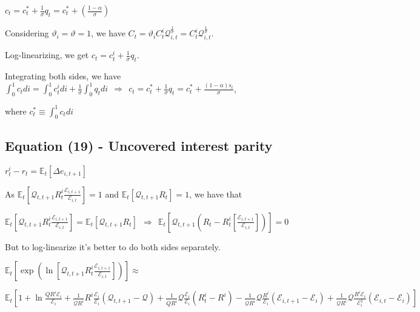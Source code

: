 \documentclass[
]{article}
\begin{document}
\(\displaystyle c_t=c_t^*+\frac{1}{\sigma}q_t = c_t^*+\left( \frac{1-\alpha}{\sigma} \right)\)

\vspace{8pt}

Considering \(\vartheta_i=\vartheta=1\), we have
\(C_t=\vartheta_i C_t^i \mathcal{Q}_{i,t}^{\frac{1}{\sigma}}= C_t^i \mathcal{Q}_{i,t}^{\frac{1}{\sigma}}\).

Log-linearizing, we get \(\displaystyle c_t=c_t^i+\frac{1}{\sigma}q_t\).

Integrating both sides, we have
\(\displaystyle \int_0^1 c_t di = \int_0^1c_t^i di + \frac{1}{\sigma} \int_0^1q_t di \ \ \Rightarrow \ \ c_t=c_t^*+ \frac{1}{\sigma}q_t=c_t^*+ \frac{(1-\alpha)s_t}{\sigma}\),

where \(c_t^* \equiv \int_0^1 c_t di\)

\vspace{12pt}

\hypertarget{equation-19---uncovered-interest-parity}{%
\subsection{Equation (19) - Uncovered interest
parity}\label{equation-19---uncovered-interest-parity}}

\(r_t^i-r_t=\mathbb{E}_t[\Delta e_{i,t+1}]\)

\vspace{8pt}

As
\(\displaystyle \mathbb{E}_t\left[ \mathcal{Q}_{t,t+1} R_t^i \frac{\mathcal{E}_{i,t+1} }{\mathcal{E}_{i,t} }\right] = 1\)
and
\(\displaystyle \mathbb{E}_t\left[ \mathcal{Q}_{t,t+1} R_t \right] = 1\),
we have that

\(\displaystyle \mathbb{E}_t\left[ \mathcal{Q}_{t,t+1} R_t^i \frac{\mathcal{E}_{i,t+1} }{\mathcal{E}_{i,t} }\right] = \displaystyle \mathbb{E}_t\left[ \mathcal{Q}_{t,t+1} R_t \right] \ \ \Rightarrow \ \  \mathbb{E}_t\left[ \mathcal{Q}_{t,t+1} \left(R_t-R_t^i \left[ \frac{\mathcal{E}_{i,t+1} }{\mathcal{E}_{i,t} } \right] \right) \right] = 0\)

But to log-linearize it's better to do both sides separately.

\(\displaystyle \mathbb{E}_t \left[\exp \left( \ln \left[ \mathcal{Q}_{t,t+1} R_t^i \frac{\mathcal{E}_{i,t+1} }{\mathcal{E}_{i,t} }\right] \right) \right] \approx\)

\(\displaystyle \mathbb{E}_t \left[ 1 + \ln\frac{Q R^i \mathcal{E}_{i}}{\mathcal{E}_{i}}+\frac{1}{\mathcal{Q}R^i}R^i \frac{ \mathcal{E}_{i}}{\mathcal{E}_{i}}(\mathcal{Q}_{t,t+1}-\mathcal{Q}) + \frac{1}{QR^i}\mathcal{Q} \frac{ \mathcal{E}_{i}}{\mathcal{E}_{i}}(R_t^i-R^i) - \frac{1}{\mathcal{Q}R^i}\mathcal{Q} \frac{R^i}{\mathcal{E}_{i}}(\mathcal{E}_{i,t+1}-\mathcal{E}_i) + \frac{1}{\mathcal{Q}R^i}\mathcal{Q} \frac{R^i \mathcal{E}_{i}}{\mathcal{E}_{i}^2}(\mathcal{E}_{i,t}-\mathcal{E}_i) \right]\)
\end{document}
